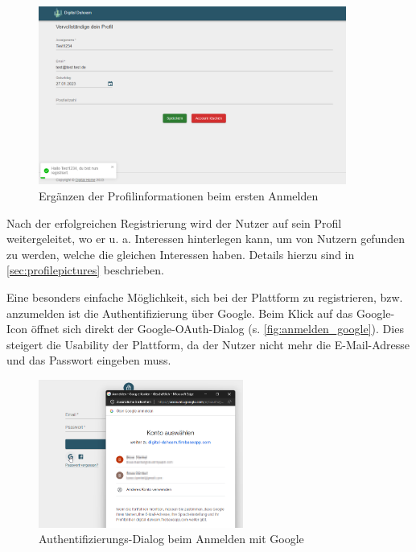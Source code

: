 \begin{figure}[htb]
    \centering
    \includegraphics[width=0.9\textwidth]{figures/boas/21_registrieren_profilinfo.png}
    \caption[]{Ergänzen der Profilinformationen beim ersten Anmelden}
    \label{fig:registrieren_profilinfo}
\end{figure}

Nach der erfolgreichen Registrierung wird der Nutzer auf sein Profil weitergeleitet, wo er u. a. Interessen hinterlegen kann, um von Nutzern gefunden zu werden, welche die gleichen Interessen haben. Details hierzu sind in \autoref{sec:profilepictures} beschrieben.

Eine besonders einfache Möglichkeit, sich bei der Plattform zu registrieren, bzw. anzumelden ist die Authentifizierung über Google. Beim Klick auf das Google-Icon öffnet sich direkt der Google-OAuth-Dialog (s. \autoref{fig:anmelden_google}). Dies steigert die Usability der Plattform, da der Nutzer nicht mehr die E-Mail-Adresse und das Passwort eingeben muss.

\begin{figure}[htb]
    \centering
    \includegraphics[width=0.6\textwidth]{figures/boas/21_anmelden_google.png}
    \caption[]{Authentifizierungs-Dialog beim Anmelden mit Google}
    \label{fig:anmelden_google}
\end{figure}

